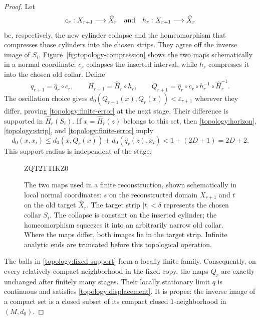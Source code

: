 \documentclass[11pt]{article}
\numberwithin{equation}{section}
\theoremstyle{definition}
\theoremstyle{remark}
\begin{document}
\begin{proof}
Let
\[
 c_r:X_{r+1}\longrightarrow\widehat X_r
 \quad\hbox{and}\quad
 h_r:X_{r+1}\longrightarrow\widehat X_r
\]
be, respectively, the new cylinder collapse and the homeomorphism that
compresses those cylinders into the chosen strips.  They agree off
the inverse image of $S_i$. Figure~\ref{fig:topology-compression} shows
the two maps schematically in a normal coordinate: $c_r$ collapses the
inserted interval, while $h_r$ compresses it into the chosen old collar.
Define
\begin{equation}\label{topology:recursion}
 q_{r+1}=\widehat q_r\circ c_r,
 \qquad H_{r+1}=\widehat H_r\circ h_r,
 \qquad
 Q_{r+1}=\widehat q_r\circ c_r\circ h_r^{-1}
                         \circ\widehat H_r^{-1}.
\end{equation}
The oscillation choice gives
$d_0(Q_{r+1}(x),Q_r(x))<\varepsilon_{r+1}$ wherever they differ, proving
\eqref{topology:finite-error} at the next stage.  Their difference is
supported in $\widehat H_r(S_i)$.  If
$x=\widehat H_r(z)$ belongs to this set, then
\eqref{topology:horizon}, \eqref{topology:strip}, and
\eqref{topology:finite-error} imply
\begin{equation}\label{topology:fixed-support}
 d_0(x,x_i)
 \le d_0(x,Q_r(x))+d_0(\widehat q_r(z),x_i)
 <1+(2D+1)=2D+2.
\end{equation}
This support radius is independent of the stage.

\begin{figure}[!b]

ZQT2TTIKZ0
\caption{The two maps used in a finite reconstruction, shown schematically
in local normal coordinates: $s$ on the reconstructed domain $X_{r+1}$
and $t$ on the old target $\widehat X_r$. The target strip $|t|<\delta$
represents the chosen collar $S_i$.
The collapse is constant on the inserted cylinder;
the homeomorphism squeezes it into an arbitrarily narrow old collar.
Where the maps differ, both images lie in the target strip.  Infinite analytic ends
are truncated before this topological operation.}
\label{fig:topology-compression}
\label{packet:collar-figure}
\end{figure}

The balls in \eqref{topology:fixed-support} form a locally finite
family.  Consequently, on every relatively compact neighborhood in
the fixed copy, the maps $Q_r$ are exactly unchanged after finitely
many stages.  Their locally stationary limit $q$ is continuous and
satisfies \eqref{topology:displacement}.  It is proper: the inverse
image of a compact set is a closed subset of its compact closed
$1$-neighborhood in $(M,d_0)$.


\end{proof}
\end{document}
